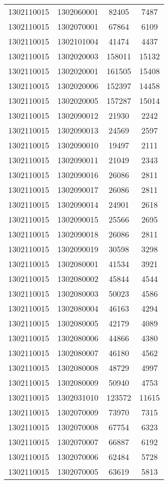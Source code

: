 \begin{longtable}{llcc}
1302110015 & 1302060001 & 82405 & 7487\\
1302110015 & 1302070001 & 67864 & 6109\\
1302110015 & 1302101004 & 41474 & 4437\\
1302110015 & 1302020003 & 158011 & 15132\\
1302110015 & 1302020001 & 161505 & 15408\\
1302110015 & 1302020006 & 152397 & 14458\\
1302110015 & 1302020005 & 157287 & 15014\\
1302110015 & 1302090012 & 21930 & 2242\\
1302110015 & 1302090013 & 24569 & 2597\\
1302110015 & 1302090010 & 19497 & 2111\\
1302110015 & 1302090011 & 21049 & 2343\\
1302110015 & 1302090016 & 26086 & 2811\\
1302110015 & 1302090017 & 26086 & 2811\\
1302110015 & 1302090014 & 24901 & 2618\\
1302110015 & 1302090015 & 25566 & 2695\\
1302110015 & 1302090018 & 26086 & 2811\\
1302110015 & 1302090019 & 30598 & 3298\\
1302110015 & 1302080001 & 41534 & 3921\\
1302110015 & 1302080002 & 45844 & 4544\\
1302110015 & 1302080003 & 50023 & 4586\\
1302110015 & 1302080004 & 46163 & 4294\\
1302110015 & 1302080005 & 42179 & 4089\\
1302110015 & 1302080006 & 44866 & 4380\\
1302110015 & 1302080007 & 46180 & 4562\\
1302110015 & 1302080008 & 48729 & 4997\\
1302110015 & 1302080009 & 50940 & 4753\\
1302110015 & 1302031010 & 123572 & 11615\\
1302110015 & 1302070009 & 73970 & 7315\\
1302110015 & 1302070008 & 67754 & 6323\\
1302110015 & 1302070007 & 66887 & 6192\\
1302110015 & 1302070006 & 62484 & 5728\\
1302110015 & 1302070005 & 63619 & 5813\\

\end{longtable}

